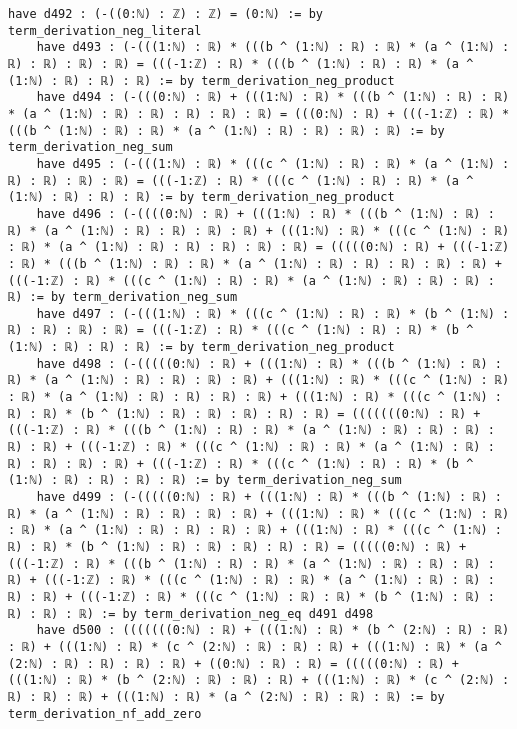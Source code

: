 \documentclass{article}
\begin{document}
\begin{tcolorbox}[colback=white!10, width=\linewidth]
\begin{lstlisting}[language=Lean4]
    have d492 : (-((0:ℕ) : ℤ) : ℤ) = (0:ℕ) := by term_derivation_neg_literal
    have d493 : (-(((1:ℕ) : ℝ) * (((b ^ (1:ℕ) : ℝ) : ℝ) * (a ^ (1:ℕ) : ℝ) : ℝ) : ℝ) : ℝ) = (((-1:ℤ) : ℝ) * (((b ^ (1:ℕ) : ℝ) : ℝ) * (a ^ (1:ℕ) : ℝ) : ℝ) : ℝ) := by term_derivation_neg_product
    have d494 : (-(((0:ℕ) : ℝ) + (((1:ℕ) : ℝ) * (((b ^ (1:ℕ) : ℝ) : ℝ) * (a ^ (1:ℕ) : ℝ) : ℝ) : ℝ) : ℝ) : ℝ) = (((0:ℕ) : ℝ) + (((-1:ℤ) : ℝ) * (((b ^ (1:ℕ) : ℝ) : ℝ) * (a ^ (1:ℕ) : ℝ) : ℝ) : ℝ) : ℝ) := by term_derivation_neg_sum
    have d495 : (-(((1:ℕ) : ℝ) * (((c ^ (1:ℕ) : ℝ) : ℝ) * (a ^ (1:ℕ) : ℝ) : ℝ) : ℝ) : ℝ) = (((-1:ℤ) : ℝ) * (((c ^ (1:ℕ) : ℝ) : ℝ) * (a ^ (1:ℕ) : ℝ) : ℝ) : ℝ) := by term_derivation_neg_product
    have d496 : (-((((0:ℕ) : ℝ) + (((1:ℕ) : ℝ) * (((b ^ (1:ℕ) : ℝ) : ℝ) * (a ^ (1:ℕ) : ℝ) : ℝ) : ℝ) : ℝ) + (((1:ℕ) : ℝ) * (((c ^ (1:ℕ) : ℝ) : ℝ) * (a ^ (1:ℕ) : ℝ) : ℝ) : ℝ) : ℝ) : ℝ) = (((((0:ℕ) : ℝ) + (((-1:ℤ) : ℝ) * (((b ^ (1:ℕ) : ℝ) : ℝ) * (a ^ (1:ℕ) : ℝ) : ℝ) : ℝ) : ℝ) : ℝ) + (((-1:ℤ) : ℝ) * (((c ^ (1:ℕ) : ℝ) : ℝ) * (a ^ (1:ℕ) : ℝ) : ℝ) : ℝ) : ℝ) := by term_derivation_neg_sum
    have d497 : (-(((1:ℕ) : ℝ) * (((c ^ (1:ℕ) : ℝ) : ℝ) * (b ^ (1:ℕ) : ℝ) : ℝ) : ℝ) : ℝ) = (((-1:ℤ) : ℝ) * (((c ^ (1:ℕ) : ℝ) : ℝ) * (b ^ (1:ℕ) : ℝ) : ℝ) : ℝ) := by term_derivation_neg_product
    have d498 : (-(((((0:ℕ) : ℝ) + (((1:ℕ) : ℝ) * (((b ^ (1:ℕ) : ℝ) : ℝ) * (a ^ (1:ℕ) : ℝ) : ℝ) : ℝ) : ℝ) + (((1:ℕ) : ℝ) * (((c ^ (1:ℕ) : ℝ) : ℝ) * (a ^ (1:ℕ) : ℝ) : ℝ) : ℝ) : ℝ) + (((1:ℕ) : ℝ) * (((c ^ (1:ℕ) : ℝ) : ℝ) * (b ^ (1:ℕ) : ℝ) : ℝ) : ℝ) : ℝ) : ℝ) = (((((((0:ℕ) : ℝ) + (((-1:ℤ) : ℝ) * (((b ^ (1:ℕ) : ℝ) : ℝ) * (a ^ (1:ℕ) : ℝ) : ℝ) : ℝ) : ℝ) : ℝ) + (((-1:ℤ) : ℝ) * (((c ^ (1:ℕ) : ℝ) : ℝ) * (a ^ (1:ℕ) : ℝ) : ℝ) : ℝ) : ℝ) : ℝ) + (((-1:ℤ) : ℝ) * (((c ^ (1:ℕ) : ℝ) : ℝ) * (b ^ (1:ℕ) : ℝ) : ℝ) : ℝ) : ℝ) := by term_derivation_neg_sum
    have d499 : (-(((((0:ℕ) : ℝ) + (((1:ℕ) : ℝ) * (((b ^ (1:ℕ) : ℝ) : ℝ) * (a ^ (1:ℕ) : ℝ) : ℝ) : ℝ) : ℝ) + (((1:ℕ) : ℝ) * (((c ^ (1:ℕ) : ℝ) : ℝ) * (a ^ (1:ℕ) : ℝ) : ℝ) : ℝ) : ℝ) + (((1:ℕ) : ℝ) * (((c ^ (1:ℕ) : ℝ) : ℝ) * (b ^ (1:ℕ) : ℝ) : ℝ) : ℝ) : ℝ) : ℝ) = (((((0:ℕ) : ℝ) + (((-1:ℤ) : ℝ) * (((b ^ (1:ℕ) : ℝ) : ℝ) * (a ^ (1:ℕ) : ℝ) : ℝ) : ℝ) : ℝ) + (((-1:ℤ) : ℝ) * (((c ^ (1:ℕ) : ℝ) : ℝ) * (a ^ (1:ℕ) : ℝ) : ℝ) : ℝ) : ℝ) + (((-1:ℤ) : ℝ) * (((c ^ (1:ℕ) : ℝ) : ℝ) * (b ^ (1:ℕ) : ℝ) : ℝ) : ℝ) : ℝ) := by term_derivation_neg_eq d491 d498
    have d500 : (((((((0:ℕ) : ℝ) + (((1:ℕ) : ℝ) * (b ^ (2:ℕ) : ℝ) : ℝ) : ℝ) + (((1:ℕ) : ℝ) * (c ^ (2:ℕ) : ℝ) : ℝ) : ℝ) + (((1:ℕ) : ℝ) * (a ^ (2:ℕ) : ℝ) : ℝ) : ℝ) : ℝ) + ((0:ℕ) : ℝ) : ℝ) = (((((0:ℕ) : ℝ) + (((1:ℕ) : ℝ) * (b ^ (2:ℕ) : ℝ) : ℝ) : ℝ) + (((1:ℕ) : ℝ) * (c ^ (2:ℕ) : ℝ) : ℝ) : ℝ) + (((1:ℕ) : ℝ) * (a ^ (2:ℕ) : ℝ) : ℝ) : ℝ) := by term_derivation_nf_add_zero

\end{lstlisting}
\end{tcolorbox}
\end{document}
